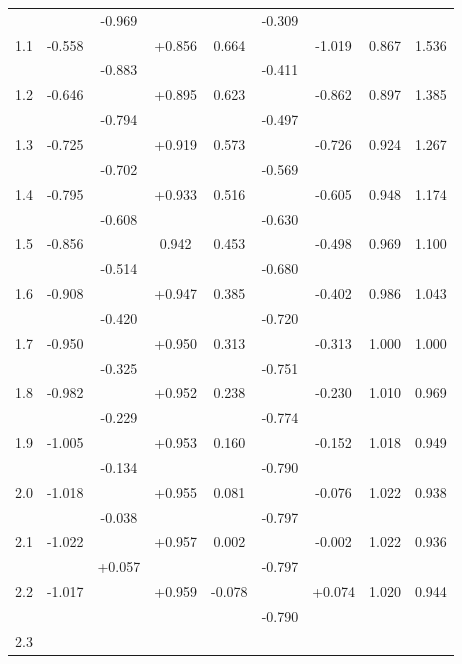 \begin{longtable}{|c|c|c|c|c|c|c|c|c|}
    ~ & ~ & -0.969 & ~ & ~ & -0.309 & ~ & ~ & ~ \\ 
    1.1 & -0.558 & ~ & +0.856 & 0.664 & ~ & -1.019 & 0.867 & 1.536 \\ 
    ~ & ~ & -0.883 & ~ & ~ & -0.411 & ~ & ~ & ~ \\ 
    1.2 & -0.646 & ~ & +0.895 & 0.623 & ~ & -0.862 & 0.897 & 1.385 \\ 
    ~ & ~ & -0.794 & ~ & ~ & -0.497 & ~ & ~ & ~ \\ 
    1.3 & -0.725 & ~ & +0.919 & 0.573 & ~ & -0.726 & 0.924 & 1.267 \\ 
    ~ & ~ & -0.702 & ~ & ~ & -0.569 & ~ & ~ & ~ \\ 
    1.4 & -0.795 & ~ & +0.933 & 0.516 & ~ & -0.605 & 0.948 & 1.174 \\ 
    ~ & ~ & -0.608 & ~ & ~ & -0.630 & ~ & ~ & ~ \\ 
    1.5 & -0.856 & ~ & 0.942 & 0.453 & ~ & -0.498 & 0.969 & 1.100 \\ 
    ~ & ~ & -0.514 & ~ & ~ & -0.680 & ~ & ~ & ~ \\ 
    1.6 & -0.908 & ~ & +0.947 & 0.385 & ~ & -0.402 & 0.986 & 1.043 \\ 
    ~ & ~ & -0.420 & ~ & ~ & -0.720 & ~ & ~ & ~ \\ 
    1.7 & -0.950 & ~ & +0.950 & 0.313 & ~ & -0.313 & 1.000 & 1.000 \\ 
    ~ & ~ & -0.325 & ~ & ~ & -0.751 & ~ & ~ & ~ \\ 
    1.8 & -0.982 & ~ & +0.952 & 0.238 & ~ & -0.230 & 1.010 & 0.969 \\ 
    ~ & ~ & -0.229 & ~ & ~ & -0.774 & ~ & ~ & ~ \\ 
    1.9 & -1.005 & ~ & +0.953 & 0.160 & ~ & -0.152 & 1.018 & 0.949 \\ 
    ~ & ~ & -0.134 & ~ & ~ & -0.790 & ~ & ~ & ~ \\ 
    2.0 & -1.018 & ~ & +0.955 & 0.081 & ~ & -0.076 & 1.022 & 0.938 \\ 
    ~ & ~ & -0.038 & ~ & ~ & -0.797 & ~ & ~ & ~ \\ 
    2.1 & -1.022 & ~ & +0.957 & 0.002 & ~ & -0.002 & 1.022 & 0.936 \\ 
    ~ & ~ & +0.057 & ~ & ~ & -0.797 & ~ & ~ & ~ \\ 
    2.2 & -1.017 & ~ & +0.959 & -0.078 & ~ & +0.074 & 1.020 & 0.944 \\ 
    ~ & ~ & ~ & ~ & ~ & -0.790 & ~ & ~ & ~ \\ 
    2.3 & ~ & ~ & ~ & ~ & ~ & ~ & ~ & ~ \\ \hline
\end{longtable}

